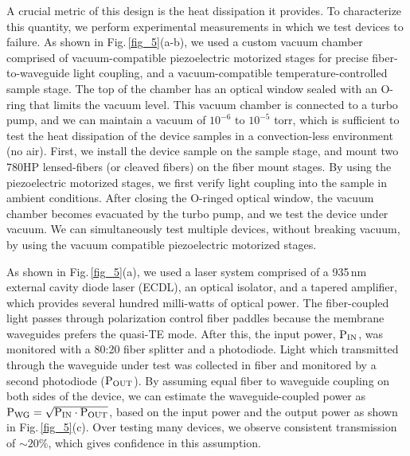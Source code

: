 \documentclass{osa-article}
\begin{document}
A crucial metric of this design is the heat dissipation it provides. To characterize this quantity, we perform experimental measurements in which we test devices to failure. As shown in Fig.\,\ref{fig_5}(a-b), we used a custom vacuum chamber comprised of vacuum-compatible piezoelectric motorized stages for precise fiber-to-waveguide light coupling, and a vacuum-compatible temperature-controlled sample stage. The top of the chamber has an optical window sealed with an O-ring that limits the vacuum level. This vacuum chamber is connected to a turbo pump, and we can maintain a vacuum of $10^{-6}$ to $10^{-5}$ torr, which is sufficient to test the heat dissipation of the device samples in a convection-less environment (no air). First, we install the device sample on the sample stage, and mount two 780HP lensed-fibers (or cleaved fibers) on the fiber mount stages. By using the piezoelectric motorized stages, we first verify light coupling into the sample in ambient conditions. After closing the O-ringed optical window, the vacuum chamber becomes evacuated by the turbo pump, and we test the device under vacuum. We can simultaneously test multiple devices, without breaking vacuum, by using the vacuum compatible piezoelectric motorized stages.

As shown in Fig.\,\ref{fig_5}(a), we used a laser system comprised of a 935\,nm external cavity diode laser (ECDL), an optical isolator, and a tapered amplifier, which provides several hundred milli-watts of optical power. The fiber-coupled light passes through polarization control fiber paddles because the membrane waveguides prefers the quasi-TE mode. After this, the input power, $\rm{P_{IN}}$, was monitored with a 80:20 fiber splitter and a photodiode. Light which transmitted through the waveguide under test was collected in fiber and monitored by a second photodiode ($\rm{P_{OUT}}$). By assuming equal fiber to waveguide coupling on both sides of the device, we can estimate the waveguide-coupled power as $\rm{P_{WG} = \sqrt{P_{IN} \cdot P_{OUT}}}$, based on the input power and the output power as shown in Fig.\,\ref{fig_5}(c). Over testing many devices, we observe consistent transmission of $\sim20\%$, which gives confidence in this assumption. 
\end{document}
